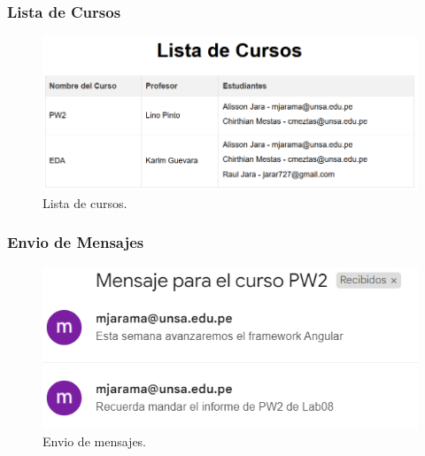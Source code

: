 \documentclass{article}
\begin{document}
\subsubsection{Lista de Cursos}
\begin{figure}[H]
	\centering
	\begin{minipage}{0.6\textwidth}
		\centering
		\includegraphics[width=\linewidth,keepaspectratio]{img/listCourses.png}
		\caption{Lista de cursos.}
	\end{minipage}
\end{figure}

\subsubsection{Envio de Mensajes}
\begin{figure}[H]
	\centering
	\begin{minipage}{0.6\textwidth}
		\centering
		\includegraphics[width=\linewidth,keepaspectratio]{img/sendMessage.png}
		\caption{Envio de mensajes.}
	\end{minipage}
\end{figure}
\end{document}
